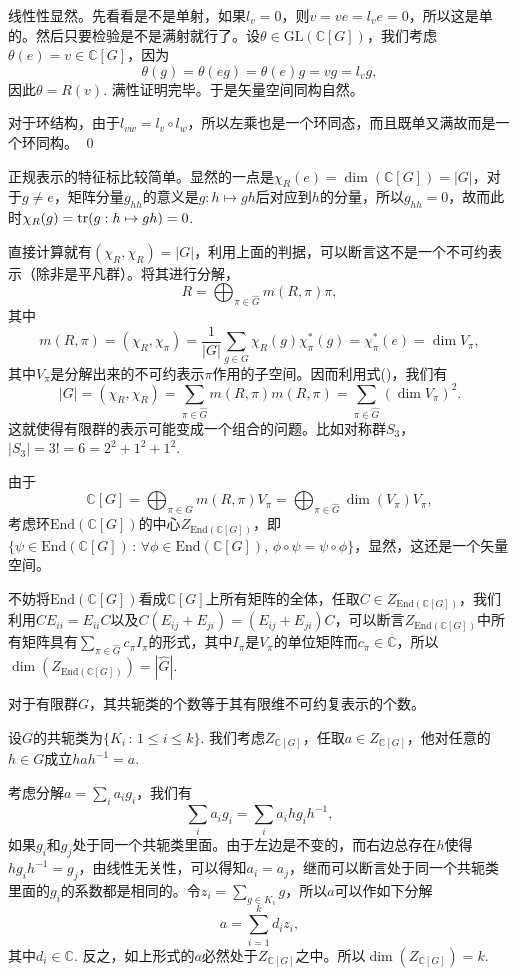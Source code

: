 \documentclass[9pt]{extarticle}
\newcommand{\cc}{\mathbb{C}}
\begin{document}
\proof
	线性性显然。先看看是不是单射，如果$l_v=0$，则$v=ve=l_ve=0$，所以这是单的。然后只要检验是不是满射就行了。设$\theta\in \mathrm{GL}(\cc [G])$，我们考虑$\theta(e)=v\in \cc [G]$，因为
	\[
		\theta(g)=\theta(eg)=\theta(e)g=vg=l_vg,
	\]
	因此$\theta=R(v)$. 满性证明完毕。于是矢量空间同构自然。

	对于环结构，由于$l_{vw}=l_v\circ l_w$，所以左乘也是一个环同态，而且既单又满故而是一个环同构。
\qed

\para 正规表示的特征标比较简单。显然的一点是$\chi_R(e)=\dim (\cc [G])=|G|$，对于$g\neq e$，矩阵分量$g_{hh}$的意义是$g:h\mapsto gh$后对应到$h$的分量，所以$g_{hh}=0$，故而此时$\chi_R(g)=\operatorname{tr}(g:h\mapsto gh)=0$.

直接计算就有$(\chi_{R},\chi_{R})=|G|$，利用上面的判据，可以断言这不是一个不可约表示（除非是平凡群）。将其进行分解，
\[
	R=\bigoplus_{\pi\in\hat{G}}m(R,\pi)\pi,
\]
其中
\[
	m(R,\pi)=(\chi_R,\chi_\pi)=\frac{1}{|G|}\sum_{g\in G}\chi_R(g)\chi_{\pi}^*(g)=\chi_{\pi}^*(e)=\dim V_{\pi},
\]
其中$V_\pi$是分解出来的不可约表示$\pi$作用的子空间。因而利用式(\theequation)，我们有
\[
	|G|=(\chi_{R},\chi_{R})=\sum_{\pi\in\hat{G}}m(R,\pi)m(R,\pi)=\sum_{\pi\in\hat{G}}(\dim V_{\pi})^2.
\]
这就使得有限群的表示可能变成一个组合的问题。比如对称群$S_3$，$|S_3|=3!=6=2^2+1^2+1^2$.

\para 由于
\[
	\cc [G]=\bigoplus_{\pi\in\hat{G}}m(R,\pi)V_\pi=\bigoplus_{\pi\in\hat{G}}\dim(V_\pi)V_\pi,
\]
考虑环$\mathrm{End}(\cc [G])$的中心$Z_{\mathrm{End}(\cc [G])}$，即$\{\psi\in \mathrm{End}(\cc [G])\,:\, \forall \phi\in \mathrm{End}(\cc [G]),\, \phi\circ\psi=\psi\circ\phi\}$，显然，这还是一个矢量空间。

不妨将$\mathrm{End}(\cc [G])$看成$\cc [G]$上所有矩阵的全体，任取$C\in Z_{\mathrm{End}(\cc [G])}$，我们利用$CE_{ii}=E_{ii}C$以及$C(E_{ij}+E_{ji})=(E_{ij}+E_{ji})C$，可以断言$Z_{\mathrm{End}(\cc [G])}$中所有矩阵具有$\sum_{\pi\in \hat{G}}c_\pi I_\pi$的形式，其中$I_\pi$是$V_\pi$的单位矩阵而$c_\pi\in\cc$，所以$\dim (Z_{\mathrm{End}(\cc [G])})=|\hat{G}|$.

\theo 对于有限群$G$，其共轭类的个数等于其有限维不可约复表示的个数。

\proof 设$G$的共轭类为$\{K_i\,:\, 1\leq i\leq k\}$. 我们考虑$Z_{\cc [G]}$，任取$a\in Z_{\cc [G]}$，他对任意的$h\in G$成立$hah^{-1}=a$. 

考虑分解$a=\sum_i a_ig_i$，我们有
\[
	\sum_i a_ig_i=\sum_i a_ihg_ih^{-1},
\]
如果$g_i$和$g_j$处于同一个共轭类里面。由于左边是不变的，而右边总存在$h$使得$hg_ih^{-1}=g_j$，由线性无关性，可以得知$a_i=a_j$，继而可以断言处于同一个共轭类里面的$g_i$的系数都是相同的。令$z_i=\sum_{g\in K_i}g$，所以$a$可以作如下分解
\[
	a=\sum_{i=1}^kd_iz_i,
\]
其中$d_i\in \cc$. 反之，如上形式的$a$必然处于$Z_{\cc [G]}$之中。所以$\dim (Z_{\cc [G]})=k$.
\end{document}
